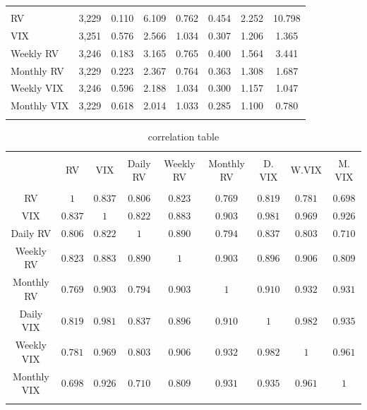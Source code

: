 \begin{table}[!htbp]
\begin{tabular}{@{\extracolsep{5pt}}lccccccc}
\hline \\[-1.8ex] 
RV & 3,229 & 0.110 & 6.109 & 0.762 & 0.454 & 2.252  & 10.798\\ 
VIX & 3,251 & 0.576 & 2.566 & 1.034 & 0.307 & 1.206 & 1.365\\ 
Weekly RV & 3,246 & 0.183 & 3.165 & 0.765 & 0.400  &  1.564  & 3.441 \\ 
Monthly RV & 3,229 & 0.223 & 2.367 & 0.764 & 0.363  & 1.308 & 1.687\\ 
Weekly VIX & 3,246 & 0.596 & 2.188 & 1.034 & 0.300  & 1.157 & 1.047\\ 
Monthly VIX & 3,229 & 0.618 & 2.014 & 1.033 & 0.285 & 1.100 & 0.780 \\ 
\hline \\[-1.8ex] 
\end{tabular} 
\end{table} 

\begin{table}[!htbp] \centering 
  \caption{correlation table} 
  \label{tab: correlation} 
\begin{tabular}{@{\extracolsep{5pt}} ccccccccc} 
\\[-1.8ex]\hline 
\hline \\[-1.8ex] 
 & RV & VIX & Daily RV & Weekly RV & Monthly RV & D. VIX & W.VIX & M. VIX \\ 
\hline \\[-1.8ex] 
RV & $1$ & $0.837$ & $0.806$ & $0.823$ & $0.769$ & $0.819$ & $0.781$ & $0.698$ \\ 
VIX & $0.837$ & $1$ & $0.822$ & $0.883$ & $0.903$ & $0.981$ & $0.969$ & $0.926$ \\ 
Daily RV & $0.806$ & $0.822$ & $1$ & $0.890$ & $0.794$ & $0.837$ & $0.803$ & $0.710$ \\ 
Weekly RV & $0.823$ & $0.883$ & $0.890$ & $1$ & $0.903$ & $0.896$ & $0.906$ & $0.809$ \\ 
Monthly RV & $0.769$ & $0.903$ & $0.794$ & $0.903$ & $1$ & $0.910$ & $0.932$ & $0.931$ \\ 
Daily VIX & $0.819$ & $0.981$ & $0.837$ & $0.896$ & $0.910$ & $1$ & $0.982$ & $0.935$ \\ 
Weekly VIX & $0.781$ & $0.969$ & $0.803$ & $0.906$ & $0.932$ & $0.982$ & $1$ & $0.961$ \\ 
Monthly VIX & $0.698$ & $0.926$ & $0.710$ & $0.809$ & $0.931$ & $0.935$ & $0.961$ & $1$ \\ 
\hline \\[-1.8ex] 
\end{tabular} 
\end{table} 

